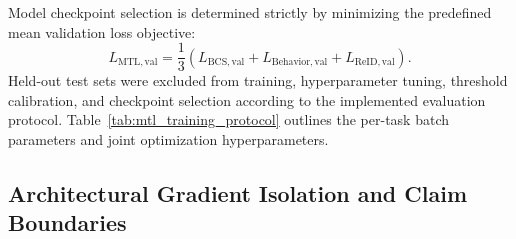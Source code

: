 Model checkpoint selection is determined strictly by minimizing the predefined mean validation loss objective:
\begin{equation}
 L_{\mathrm{MTL,val}} = \frac{1}{3}\left( L_{\mathrm{BCS,val}} + L_{\mathrm{Behavior,val}} + L_{\mathrm{ReID,val}} \right).
\end{equation}
Held-out test sets were excluded from training, hyperparameter tuning, threshold calibration, and checkpoint selection according to the implemented evaluation protocol. Table~\ref{tab:mtl_training_protocol} outlines the per-task batch parameters and joint optimization hyperparameters.



\subsection{Architectural Gradient Isolation and Claim Boundaries}

